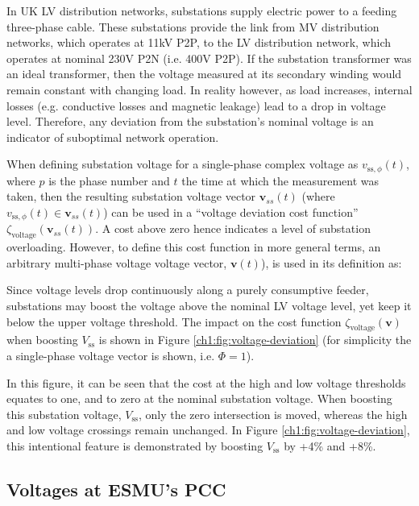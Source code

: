 In UK LV distribution networks, substations supply electric power to a feeding three-phase cable.
These substations provide the link from MV distribution networks, which operates at 11kV P2P, to the LV distribution network, which operates at nominal 230V P2N (i.e. 400V P2P).
If the substation transformer was an ideal transformer, then the voltage measured at its secondary winding would remain constant with changing load.
In reality however, as load increases, internal losses (e.g. conductive losses and magnetic leakage) lead to a drop in voltage level.
Therefore, any deviation from the substation's nominal voltage is an indicator of suboptimal network operation.

When defining substation voltage for a single-phase complex voltage as $v_{\text{ss},\phi}(t)$, where $p$ is the phase number and $t$ the time at which the measurement was taken, then the resulting substation voltage vector $\textbf{v}_{ss}(t)$ (where $v_{\text{ss},\phi}(t) \in \textbf{v}_{ss}(t)$) can be used in a ``voltage deviation cost function'' $\zeta_\text{voltage}(\textbf{v}_{ss}(t))$.
A cost above zero hence indicates a level of substation overloading.
However, to define this cost function in more general terms, an arbitrary multi-phase voltage voltage vector, $\textbf{v}(t)$), is used in its definition as:



Since voltage levels drop continuously along a purely consumptive feeder, substations may boost the voltage above the nominal LV voltage level, yet keep it below the upper voltage threshold.
The impact on the cost function $\zeta_\text{voltage}(\textbf{v})$ when boosting $V_\text{ss}$ is shown in Figure \ref{ch1:fig:voltage-deviation} (for simplicity the a single-phase voltage vector is shown, i.e. $\Phi = 1$).



In this figure, it can be seen that the cost at the high and low voltage thresholds equates to one, and to zero at the nominal substation voltage.
When boosting this substation voltage, $V_\text{ss}$, only the zero intersection is moved, whereas the high and low voltage crossings remain unchanged.
In Figure \ref{ch1:fig:voltage-deviation}, this intentional feature is demonstrated by boosting $V_\text{ss}$ by +4\% and +8\%.

\subsection{Voltages at ESMU's PCC}
\label{ch1:subsec:voltages-at-esmu}

